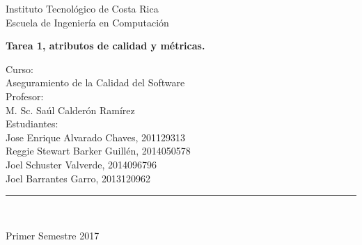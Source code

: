 \documentclass[12pt]{article}
\begin{document}
\begin{titlepage}
\begin{center}
\vspace*{-1in}
\begin{figure}[htb]
\begin{center}


\end{center}
\end{figure}
\vspace*{0.1in}
\begin{Large}
Instituto Tecnológico de Costa Rica\\
Escuela de Ingeniería en Computación\\
\vspace*{0.8in}
\end{Large}
\begin{Large}
\textbf{Tarea 1, atributos de calidad y métricas. } \\
\end{Large}
\vspace*{1.1in}
\begin{large}
Curso:\\
Aseguramiento de la Calidad del Software \\
\vspace*{1 in}
Profesor:\\
M. Sc. Saúl Calderón Ramírez\\
\vspace*{1in}
Estudiantes:\\
\vspace*{0.1in}
Jose Enrique Alvarado Chaves, 201129313\\
Reggie Stewart Barker Guillén, 2014050578\\
Joel Schuster Valverde, 2014096796\\
Joel Barrantes Garro, 2013120962\\
\vspace*{0.5in}
\end{large}
\vspace*{1.5in}
\rule{80mm}{0.1mm}\\
\vspace*{0.1in}
\begin{large}
Primer Semestre 2017
\end{large}
\end{center}
\end{titlepage}
\tableofcontents
\thispagestyle{empty}
\cleardoublepage
\setcounter{page}{1}
\vspace*{0.2in}
\end{document}
